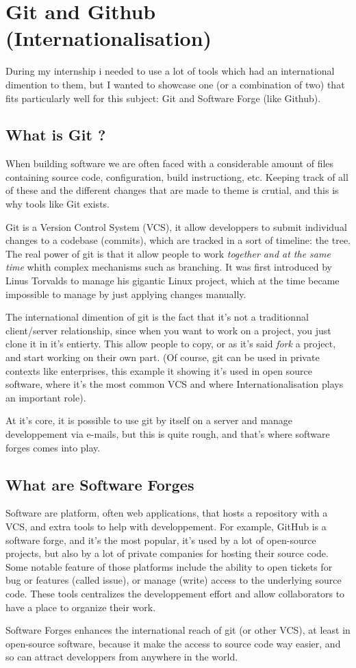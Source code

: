 \chapter{Git and Github (Internationalisation)}
\label{international}

During my internship i needed to use a lot of tools which had an international dimention to them, but I wanted to showcase one (or a combination of two) that fits particularly well for this subject:
Git and Software Forge (like Github).


\section{What is Git ?}

When building software we are often faced with a considerable amount of files containing source code, configuration, build instructiong, etc.
Keeping track of all of these and the different changes that are made to theme is crutial, and this is why tools like Git exists.

Git is a Version Control System (VCS), it allow developpers to submit individual changes to a codebase (commits), which are tracked in a sort of timeline: the tree.
The real power of git is that it allow people to work \emph{together and at the same time} whith complex mechanisms such as branching.
It was first introduced by Linus Torvalds to manage his gigantic Linux project, which at the time became impossible to manage by just applying changes manually.

The international dimention of git is the fact that it's not a traditionnal client/server relationship, since when you want to work on a project, you just clone it in it's entierty.
This allow people to copy, or as it's said \emph{fork} a project, and start working on their own part.
(Of course, git can be used in private contexts like enterprises, this example it showing it's used in open source software, where it's the most common VCS and where Internationalisation plays an important role).

At it's core, it is possible to use git by itself on a server and manage developpement via e-mails, but this is quite rough, and that's where software forges comes into play.


\section{What are Software Forges}

Software are platform, often web applications, that hosts a repository with a VCS, and extra tools to help with developpement.
For example, GitHub is a software forge, and it's the most popular, it's used by a lot of open-source projects, but also by a lot of private companies for hosting their source code.
Some notable feature of those platforms include the ability to open tickets for bug or features (called issue), or manage (write) access to the underlying source code.
These tools centralizes the developpement effort and allow collaborators to have a place to organize their work.

Software Forges enhances the international reach of git (or other VCS), at least in open-source software, because it make the access to source code way easier,
and so can attract developpers from anywhere in the world.
